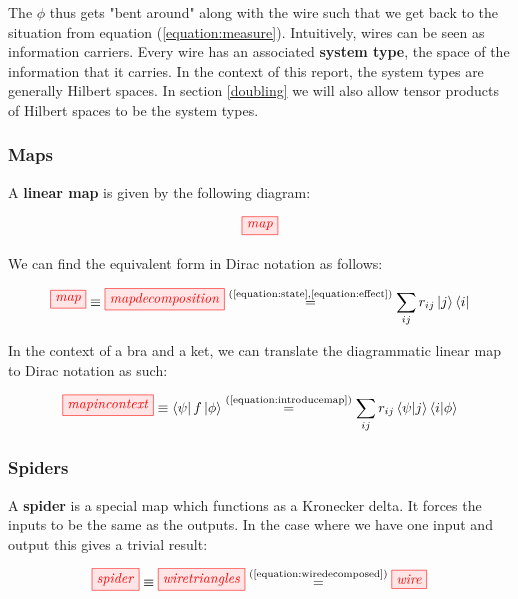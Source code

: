 \documentclass[]{article}
\newcommand{\equaltext}[1]{\ensuremath{\stackrel{\text{#1}}{=}}}
\begin{document}
The $\phi$ thus gets "bent around" along with the wire such that we get back to the situation from equation (\ref{equation:measure}). Intuitively, wires can be seen as information carriers. Every wire has an associated \textbf{system type}, the space of the information that it carries. In the context of this report, the system types are generally Hilbert spaces. In section \ref{doubling} we will also allow tensor products of Hilbert spaces to be the system types.

\subsubsection{Maps}
\label{maps}

A \textbf{linear map} is given by the following diagram:

\begin{equation}
\tikzfig{map}
\end{equation}

We can find the equivalent form in Dirac notation as follows:

\begin{equation}
\label{equation:introducemap}
\tikzfig{map} \equiv \tikzfig{mapdecomposition} \equaltext{(\ref{equation:state},\ref{equation:effect})} \sum_{ij}r_{ij}\ket{j}\bra{i}
\end{equation}

In the context of a bra and a ket, we can translate the diagrammatic linear map to Dirac notation as such:

\begin{equation}
\tikzfig{mapincontext} \equiv \bra{\psi}f\ket{\phi} \equaltext{(\ref{equation:introducemap})} \sum_{ij}r_{ij} \bra{\psi}\ket{j}\bra{i}\ket{\phi}
\end{equation}

\subsubsection{Spiders}
\label{spiders}

A \textbf{spider} is a special map which functions as a Kronecker delta. It forces the inputs to be the same as the outputs. In the case where we have one input and output this gives a trivial result:

\begin{equation}
\label{equation:boringspider}
\tikzfig{spider} \equiv \tikzfig{wiretriangles} \equaltext{(\ref{equation:wiredecomposed})} \tikzfig{wire}
\end{equation}
\end{document}
